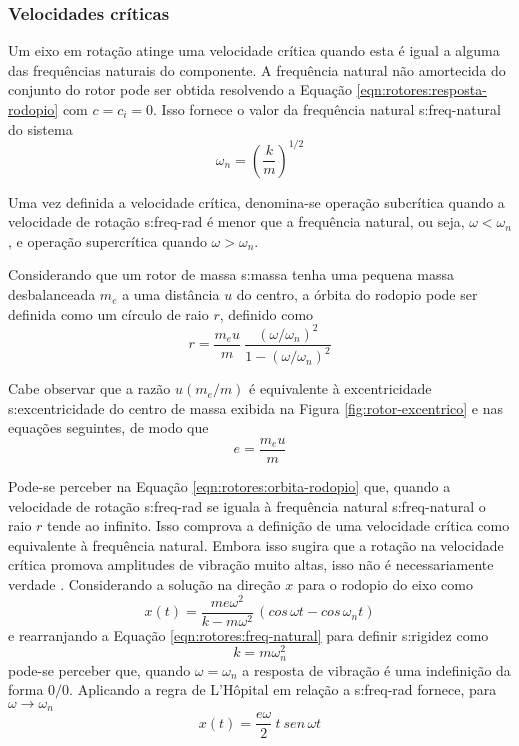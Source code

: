 \documentclass[12pt,openright,oneside,a4paper,
	chapter=TITLE,section=TITLE,
	english,brazil]{abntex2}
\begin{document}
	\subsubsection{Velocidades críticas}
	Um eixo em rotação atinge uma velocidade crítica quando esta é igual a alguma das frequências naturais do componente. A frequência natural não amortecida do conjunto do rotor pode ser obtida \cite{rao:2008} resolvendo a Equação \ref{eqn:rotores:resposta-rodopio} com $ c = c_i = 0 $. Isso fornece o valor da frequência natural \gls{s:freq-natural} do sistema
	\begin{equation} \label{eqn:rotores:freq-natural}
		\omega_n = \left( \frac{k}{m} \right)^{1/2}
	\end{equation}
	
	Uma vez definida a velocidade crítica, denomina-se \cite{dimarogonas:1995} operação subcrítica quando a velocidade de rotação \gls{s:freq-rad} é menor que a frequência natural, ou seja, $ \omega < \omega_n $, e operação supercrítica quando $ \omega > \omega_n $.
	
	Considerando que um rotor de massa \gls{s:massa} tenha uma pequena massa desbalanceada $ m_e $ a uma distância $ u $ do centro, a órbita do rodopio pode ser definida como um círculo de raio $ r $, definido como \cite{dimarogonas:1995}
	\begin{equation} \label{eqn:rotores:orbita-rodopio}
		r = \frac{m_e u}{m}\ \frac{(\omega/\omega_n)^2}{1 - (\omega/\omega_n)^2}
	\end{equation}
	
	Cabe observar que a razão $ u(m_e/m) $ é equivalente à excentricidade \gls{s:excentricidade} do centro de massa exibida na Figura \ref{fig:rotor-excentrico} e nas equações seguintes, de modo que
	\begin{equation}
		\mathit{e} = \frac{m_e u}{m}
	\end{equation}
	
	Pode-se perceber na Equação \ref{eqn:rotores:orbita-rodopio} que, quando a velocidade de rotação \gls{s:freq-rad} se iguala à frequência natural \gls{s:freq-natural} o raio $ r $ tende ao infinito. Isso comprova a definição de uma velocidade crítica como equivalente à frequência natural. Embora isso sugira que a rotação na velocidade crítica promova amplitudes de vibração muito altas, isso não é necessariamente verdade \cite{dimarogonas:1995}. Considerando a solução na direção $ x $ para o rodopio do eixo como \cite{dimarogonas:1995}
	\begin{equation}
		x(t) = \frac{m\mathit{e}\omega^2}{k-m\omega^2}\,(cos\,\omega t - cos\,\omega_n t)
	\end{equation}
	e rearranjando a Equação \ref{eqn:rotores:freq-natural} para definir \gls{s:rigidez} como \[ k = m\omega_n^2 \] pode-se perceber que, quando $ \omega = \omega_n $ a resposta de vibração é uma indefinição da forma $ 0/0 $. Aplicando a regra de L'Hôpital em relação a \gls{s:freq-rad} fornece, para $ \omega\to\omega_n $
	\begin{equation}
		x(t) = \frac{\mathit{e}\omega}{2}\ t\ sen\,\omega t
	\end{equation}
	
\end{document}
